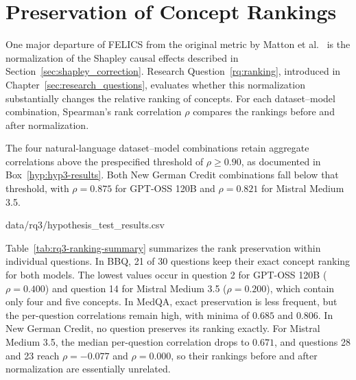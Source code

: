\section{Preservation of Concept Rankings}
\label{sec:results-ranking-preservation}

One major departure of FELICS from the original metric by Matton et al.~\cite{mattonWalkTalkMeasuring2024} is the normalization of the Shapley causal effects described in Section~\ref{sec:shapley_correction}. Research Question~\ref{rq:ranking}, introduced in Chapter~\ref{sec:research_questions}, evaluates whether this normalization substantially changes the relative ranking of concepts. For each dataset--model combination, Spearman's rank correlation $\rho$ compares the rankings before and after normalization.

The four natural-language dataset--model combinations retain aggregate correlations above the prespecified threshold of $\rho\geq0.90$, as documented in Box~\ref{hyp:hyp3-results}. Both New German Credit combinations fall below that threshold, with $\rho=0.875$ for GPT-OSS 120B and $\rho=0.821$ for Mistral Medium 3.5.

  {data/rq3/hypothesis_test_results.csv}

Table~\ref{tab:rq3-ranking-summary} summarizes the rank preservation within individual questions. In BBQ, 21 of 30 questions keep their exact concept ranking for both models. The lowest values occur in question 2 for GPT-OSS 120B ($\rho=0.400$) and question 14 for Mistral Medium 3.5 ($\rho=0.200$), which contain only four and five concepts. In MedQA, exact preservation is less frequent, but the per-question correlations remain high, with minima of $0.685$ and $0.806$. In New German Credit, no question preserves its ranking exactly. For Mistral Medium 3.5, the median per-question correlation drops to $0.671$, and questions 28 and 23 reach $\rho=-0.077$ and $\rho=0.000$, so their rankings before and after normalization are essentially unrelated.

